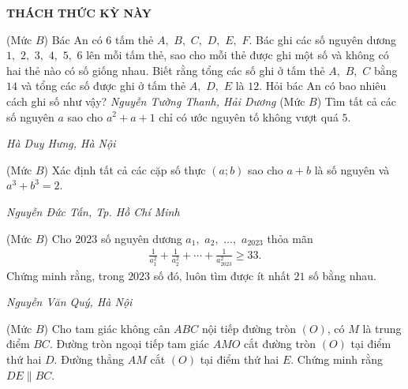 \begin{center}
	\vspace*{-5pt}
	\textbf{\color{thachthuctoanhoc}\color{thachthuctoanhoc}\color{thachthuctoanhoc}THÁCH THỨC KỲ NÀY}
	\vspace*{-5pt}
\end{center}
\begin{multicols}{2}
	\setlength{\abovedisplayskip}{4pt}
	\setlength{\belowdisplayskip}{4pt}
	{}
	(Mức $B$) Bác An có $6$ tấm thẻ $A,$ $B,$ $C,$ $D,$ $E,$ $F$. Bác ghi các số nguyên dương $1,$ $2,$ $3,$ $4,$ $5,$ $6$ lên mỗi tấm thẻ, sao cho mỗi thẻ được ghi một số và không có hai thẻ nào có số giống nhau. Biết rằng tổng các số ghi ở tấm thẻ $A,$ $B,$ $C$ bằng $14$ và tổng các số được ghi ở tấm thẻ $A,$ $D,$ $E$ là $12$. Hỏi bác An có bao nhiêu cách ghi số như vậy?
	\vskip 0.3cm
	\hfill	\textit{Nguyễn Tường Thanh, Hải Dương}
	\vskip 0.3cm
	{}
	(Mức $B$) Tìm tất cả các số nguyên $a$ sao cho $a^2+a+1$ chỉ có ước nguyên tố không vượt quá $5$. 
	\begin{flushright}
		\textit{Hà Duy Hưng, Hà Nội}
	\end{flushright}
	{}
	(Mức $B$) Xác định tất cả các cặp số thực $(a;b)$ sao cho $a+b$ là số nguyên và $a^3+b^3=2$. 
	\begin{flushright}
		\textit{Nguyễn Đức Tấn, Tp. Hồ Chí Minh}
	\end{flushright}
	{}
	(Mức $B$) Cho $2023$ số nguyên dương $a_1,$ $a_2,$ $\ldots,$ $a_{2023}$ thỏa mãn
	\begin{align*}
		\frac{1}{a_1^2}+\frac{1}{a_2^2}+\cdots+\frac{1}{a_{2023}^2}\ge 33.
	\end{align*}
	Chứng minh rằng, trong $2023$ số đó, luôn tìm được ít nhất $21$ số bằng nhau.  
	\begin{flushright}
		\textit{Nguyễn Văn Quý, Hà Nội}
	\end{flushright}
	{}
	(Mức $B$) Cho tam giác không cân $ABC$ nội tiếp đường tròn $(O)$, có $M$ là trung điểm $BC$. Đường tròn ngoại tiếp tam giác $AMO$ cắt đường tròn $(O)$ tại điểm thứ hai $D$. Đường thẳng $AM$ cắt $(O)$  tại điểm thứ hai $E$. Chứng minh rằng $DE\| BC$. 
	\begin{center}

\end{center}
\end{multicols}
